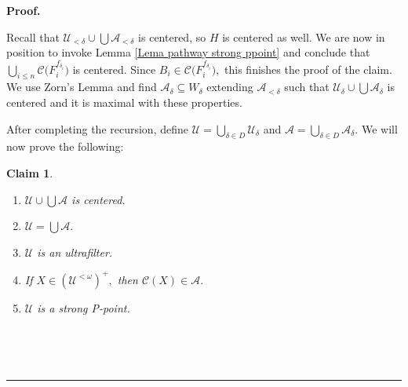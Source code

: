 \documentclass{article}%
\newtheorem{claim}[theorem]{Claim}
\newenvironment{proof}[1][Proof]{\noindent\textbf{#1.} }{\ \rule{0.5em}{0.5em}}
\begin{document}
\begin{proof}
\qquad\ \ \ \ 

Recall that $\mathcal{U}_{<\delta}\cup%
{\textstyle\bigcup}
\mathcal{A}_{<\delta}$ is centered, so $H$ is centered as well. We are now in
position to invoke Lemma \ref{Lema pathway strong ppoint} and conclude that $%
{\textstyle\bigcup\limits_{i\leq n}}
\mathcal{C(}F_{i}^{f_{\delta_{i}}})$ is centered. Since $B_{i}\in
\mathcal{C(}F_{i}^{f_{\delta_{i}}}),$ this finishes the proof of the claim. We
use Zorn's Lemma and find $\mathcal{A}_{\delta}\subseteq W_{\delta}$ extending
$\mathcal{A}_{<\delta}$ such that $\mathcal{U}_{\delta}\cup%
{\textstyle\bigcup}
\mathcal{A}_{\delta}$ is centered and it is maximal with these properties.

\qquad\qquad\qquad

After completing the recursion, define $\mathcal{U=}%
{\textstyle\bigcup\limits_{\delta\in D}}
\mathcal{U}_{\delta}$ and $\mathcal{A=}%
{\textstyle\bigcup\limits_{\delta\in D}}
\mathcal{A}_{\delta}.$ We will now prove the following:

\begin{claim}
\qquad\ \ \ 

\begin{enumerate}
\item $\mathcal{U\cup}%
{\textstyle\bigcup}
\mathcal{A}$ is centered.

\item $\mathcal{U}=%
{\textstyle\bigcup}
\mathcal{A}.$

\item $\mathcal{U}$ is an ultrafilter.

\item If $X\in\left(  \mathcal{U}^{<\omega}\right)  ^{+},$ then $\mathcal{C}%
\left(  X\right)  \in\mathcal{A}.$

\item $\mathcal{U}$ is a strong \textsf{P}-point.
\end{enumerate}
\end{claim}

\qquad\qquad\ \ \ \ 


\end{proof}
\end{document}
